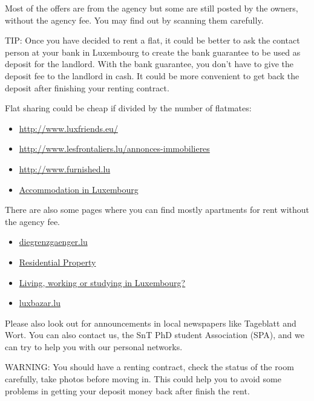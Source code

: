 Most of the offers are from the agency but some are still posted by the owners, without the agency fee.
You may find out by scanning them carefully. 

TIP: Once you have decided to rent a flat, it could be better to ask the contact person at your bank in Luxembourg to create the bank guarantee to be used as deposit for the landlord. 
With the bank guarantee, you don't have to give the deposit fee to the landlord in cash. 
It could be more convenient to get back the deposit after finishing your renting contract. 

Flat sharing could be cheap if divided by the number of flatmates:
\begin{itemize}
\item \url{http://www.luxfriends.eu/}
\item \url{http://www.lesfrontaliers.lu/annonces-immobilieres}
\item \url{http://www.furnished.lu} 
\item \href{http://fr.welchome.com/flateshare-houseshare/LU-Luxembourg/luxembourg?oa_code=99501330}{Accommodation in Luxembourg} 
\end{itemize}

There are also some pages where you can find mostly apartments for rent without the agency fee.
\begin{itemize}
	\item \href{http://www.diegrenzgaenger.lu/index.php?p=annonce&a=srub&id=10}{diegrenzgaenger.lu}
	\item \href{http://luxembourg.angloinfo.com/classifieds/index/1003-1005-1004-1010/category/residential-property/}{Residential Property}
	\item \href{http://www.justlanded.com/english/Luxembourg}{Living, working or studying in Luxembourg?}
	\item \href{http://www.luxbazar.lu}{luxbazar.lu}
\end{itemize}

Please also look out for announcements in local newspapers like Tageblatt and Wort.
You can also contact us, the SnT PhD student Association (SPA), and we can try to help you with our personal networks. 

WARNING: You should have a renting contract, check the status of the room carefully, take photos before moving in. 
This could help you to avoid some problems in getting your deposit money back after finish the rent. 

